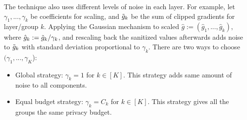 The technique also uses different levels of noise in each layer. For example, let $\gamma_1,...,\gamma_k$ be coefficients for scaling, and $\Tilde{g}_k$ be the sum of clipped gradients for layer/group $k$. Applying the Gaussian mechanism to scaled $\hat{g}:= (\hat{g}_1,...,\hat{g}_k)$, where $\hat{g}_k:=\Tilde{g}_k/\gamma_k$, and rescaling back the sanitized values afterwards adds noise to $\Tilde{g}_k$ with standard deviation proportional to $\gamma_k$. There are two ways to choose $(\gamma_1,...,\gamma_K$):
\begin{itemize}
\item Global strategy: $\gamma_k=1$ for $k \in [K]$. This strategy adds same amount of noise to all components.
\item Equal budget strategy: $\gamma_k = C_k$ for $k \in [K]$. This strategy gives all the groups the same privacy budget.
\end{itemize}


